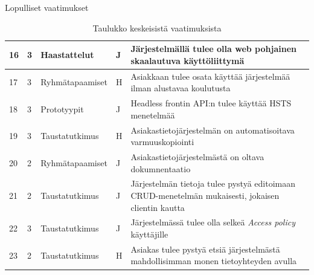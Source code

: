 \documentclass{beamer}
\begin{document}
\begin{frame}{Lopulliset vaatimukset}
\begin{table}[]
{\begin{tabular}{lllll}
		\multicolumn{1}{|l|}{16}		&			 \multicolumn{1}{|l|}{3}& \multicolumn{1}{l|}{Haastattelut}	& \multicolumn{1}{l|}{J}                                    & \multicolumn{1}{l|}{Järjestelmällä tulee olla web pohjainen skaalautuva käyttöliittymä}                               \\ \hline
		\multicolumn{1}{|l|}{17}		&			 \multicolumn{1}{|l|}{3}& \multicolumn{1}{l|}{Ryhmätapaamiset}	& \multicolumn{1}{l|}{H}                                    & \multicolumn{1}{l|}{Asiakkaan tulee osata käyttää järjestelmää ilman alustavaa koulutusta}                               \\ \hline
		\multicolumn{1}{|l|}{18}		&			 \multicolumn{1}{|l|}{3}& \multicolumn{1}{l|}{Prototyypit}	& \multicolumn{1}{l|}{J}                                    & \multicolumn{1}{l|}{Headless frontin API:n tulee käyttää HSTS menetelmää}																	\\ \hline
		\multicolumn{1}{|l|}{19}		&			 \multicolumn{1}{|l|}{3}& \multicolumn{1}{l|}{Taustatutkimus}	& \multicolumn{1}{l|}{H}                                    & \multicolumn{1}{l|}{Asiakastietojärjestelmän on automatisoitava varmuuskopiointi}								\\ \hline
		\multicolumn{1}{|l|}{20}		&			 \multicolumn{1}{|l|}{2}& \multicolumn{1}{l|}{Ryhmätapaamiset}	& \multicolumn{1}{l|}{J}                                    & \multicolumn{1}{l|}{Asiakastietojärjestelmästä on oltava dokumnentaatio}														\\ \hline
		\multicolumn{1}{|l|}{21}		&			 \multicolumn{1}{|l|}{2}& \multicolumn{1}{l|}{Taustatutkimus}	& \multicolumn{1}{l|}{J}                                    & \multicolumn{1}{l|}{Järjestelmän tietoja tulee pystyä editoimaan CRUD-menetelmän mukaisesti, jokaisen clientin kautta}									\\ \hline
		\multicolumn{1}{|l|}{22}		&			 \multicolumn{1}{|l|}{3}& \multicolumn{1}{l|}{Taustatutkimus}	& \multicolumn{1}{l|}{J}                                    & \multicolumn{1}{l|}{Järjestelmässä tulee olla selkeä \textit{Access policy} käyttäjille}						\\ \hline
		\multicolumn{1}{|l|}{23}		&			 \multicolumn{1}{|l|}{2}& \multicolumn{1}{l|}{Taustatutkimus}	& \multicolumn{1}{l|}{H}                                    & \multicolumn{1}{l|}{Asiakas tulee pystyä etsiä järjestelmästä mahdollisimman monen tietoyhteyden avulla}						\\ \hline
		                     
		
   

    \end{tabular}
}
    \caption{Taulukko keskeisistä vaatimuksista}
    \label{tab:vaatimukset}
    \end{table}
\end{frame}
\end{document}
